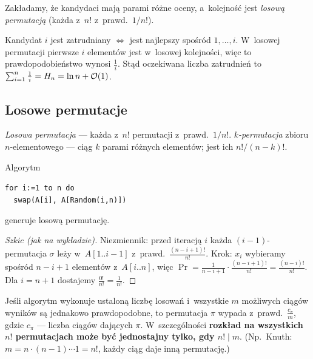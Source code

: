 \documentclass[11pt]{article}
\begin{document}
Zakładamy, że kandydaci mają parami różne oceny, a~kolejność jest
\emph{losową permutacją} (każda z~$n!$ z~prawd.\ $1/n!$).

\begin{fakt}[z wykładu]\label{fakt:rekord}
Kandydat $i$ jest zatrudniany $\iff$ jest najlepszy spośród $1,\dots,i$.
W~losowej permutacji pierwsze $i$ elementów jest w~losowej kolejności, więc
to prawdopodobieństwo wynosi $\frac1i$. Stąd oczekiwana liczba zatrudnień
to $\sum_{i=1}^n\frac1i=H_n=\ln n+\mathcal{O}(1)$.
\end{fakt}

\subsection*{Losowe permutacje}

\begin{definicja}
\emph{Losowa permutacja} --- każda z~$n!$ permutacji z~prawd.\ $1/n!$.
\emph{$k$-permutacja} zbioru $n$-elementowego --- ciąg $k$ parami różnych
elementów; jest ich $n!/(n-k)!$.
\end{definicja}

\begin{twierdzenie}\label{tw:knuth}
Algorytm
\begin{center}
\texttt{for i:=1 to n do}\\ \texttt{\ \ swap(A[i], A[Random(i,n)])}
\end{center}
generuje losową permutację.
\end{twierdzenie}
\begin{proof}[Szkic (jak na wykładzie)]
Niezmiennik: przed iteracją $i$ każda $(i-1)$-permutacja $\sigma$ leży
w~$A[1..i-1]$ z~prawd.\ $\frac{(n-i+1)!}{n!}$. Krok: $x_i$ wybieramy
spośród $n-i+1$ elementów z~$A[i..n]$, więc
$\Pr=\frac{1}{n-i+1}\cdot\frac{(n-i+1)!}{n!}=\frac{(n-i)!}{n!}$.
Dla $i=n+1$ dostajemy $\frac{0!}{n!}=\frac1{n!}$.
\end{proof}

\begin{fakt}\label{fakt:liczenie}
Jeśli algorytm wykonuje ustaloną liczbę losowań i~wszystkie $m$ możliwych
ciągów wyników są jednakowo prawdopodobne, to permutacja $\pi$ wypada
z~prawd.\ $\frac{c_\pi}{m}$, gdzie $c_\pi$ --- liczba ciągów dających $\pi$.
W~szczególności \textbf{rozkład na wszystkich $n!$ permutacjach może być
jednostajny tylko, gdy $n!\mid m$}. (Np.\ Knuth: $m=n\cdot(n-1)\cdots1=n!$,
każdy ciąg daje inną permutację.)
\end{fakt}
\end{document}
